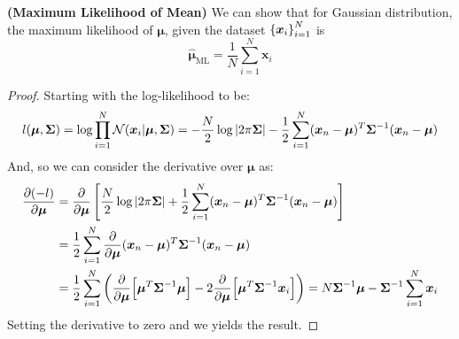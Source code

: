 \begin{proposition}{\textbf{(Maximum Likelihood of Mean)}}
   We can show that for Gaussian distribution, the maximum likelihood of $\boldsymbol \mu$, given the dataset $\left\{ \boldsymbol x_i \right\}^N_{i=1}$ is 
   \begin{equation*}
       \hat{\boldsymbol \mu}_\text{ML} = \frac{1}{N}\sum^N_{i=1}\boldsymbol x_i
   \end{equation*} 
\end{proposition}
\begin{proof}
    Starting with the log-likelihood to be:
    \begin{equation*}
        l(\boldsymbol \mu, \boldsymbol \Sigma) = \log \prod^N_{i=1} \mathcal{N}(\boldsymbol x_i|\boldsymbol \mu, \boldsymbol \Sigma) = -\frac{N}{2}\log\left| 2\pi\boldsymbol \Sigma \right| - \frac{1}{2}\sum^N_{i=1}(\boldsymbol x_n - \boldsymbol \mu)^T\boldsymbol \Sigma^{-1}(\boldsymbol x_n - \boldsymbol \mu)
    \end{equation*}
    And, so we can consider the derivative over $\boldsymbol \mu$ as:
    \begin{equation*}
    \begin{aligned}
        \frac{\partial (-l)}{\partial \boldsymbol \mu} 
        &= \frac{\partial}{\partial \boldsymbol \mu}\left[ \frac{N}{2}\log\left| 2\pi\boldsymbol \Sigma \right| + \frac{1}{2}\sum^N_{i=1}(\boldsymbol x_n - \boldsymbol \mu)^T\boldsymbol \Sigma^{-1}(\boldsymbol x_n - \boldsymbol \mu) \right] \\
        &= \frac{1}{2}\sum^N_{i=1}\frac{\partial}{\partial \boldsymbol \mu}(\boldsymbol x_n - \boldsymbol \mu)^T\boldsymbol \Sigma^{-1}(\boldsymbol x_n - \boldsymbol \mu) \\
        &= \frac{1}{2}\sum^N_{i=1}\left( \frac{\partial}{\partial \boldsymbol \mu}\Big[\boldsymbol \mu^T\boldsymbol \Sigma^{-1}\boldsymbol\mu\Big] - 2\frac{\partial}{\partial \boldsymbol \mu}\Big[ \boldsymbol \mu^T\boldsymbol \Sigma^{-1}\boldsymbol x_i  \Big] \right) = N\boldsymbol \Sigma^{-1} \boldsymbol \mu - \boldsymbol \Sigma^{-1}\sum_{i=1}^N\boldsymbol x_i \\
    \end{aligned}
    \end{equation*}
    Setting the derivative to zero and we yields the result.
\end{proof}

